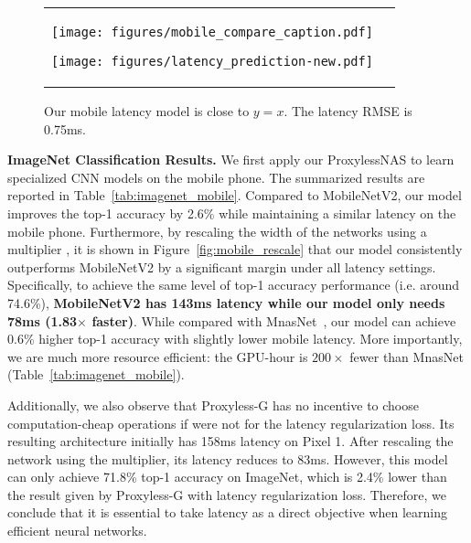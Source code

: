 \documentclass{article} \usepackage{iclr2019_conference,times}
\newcommand{\minisection}[1]{\vspace{5pt}\noindent\textbf{#1.}}
\begin{document}
\begin{figure}[t]
    \centering
    \begin{tabular}{l  r}
    \begin{minipage}{0.40\linewidth}
        \texttt{[image: figures/mobile\_compare\_caption.pdf]}
        \caption{ProxylessNAS consistently outperforms MobileNetV2 under various latency settings.}
        \label{fig:mobile_rescale}
    \end{minipage}
    \qquad
    \begin{minipage}{0.42\linewidth}
        \texttt{[image: figures/latency\_prediction-new.pdf]}
        \caption{Our mobile latency model is close to $y=x$. The latency RMSE is 0.75ms.}
        \label{fig:latency_prediction}
    \end{minipage}
    \end{tabular}
\end{figure}

\minisection{ImageNet Classification Results} We first apply our ProxylessNAS to learn specialized CNN models on the mobile phone. The summarized results are reported in Table~\ref{tab:imagenet_mobile}. Compared to MobileNetV2, our model improves the top-1 accuracy by 2.6\% while maintaining a similar latency on the mobile phone. Furthermore, by rescaling the width of the networks using a multiplier \citep{sandler2018mobilenetv2,tan2018mnasnet}, it is shown in Figure~\ref{fig:mobile_rescale} that our model consistently outperforms MobileNetV2 by a significant margin under all latency settings. Specifically, to achieve the same level of top-1 accuracy performance (i.e. around 74.6\%), \textbf{MobileNetV2 has 143ms latency while our model only needs 78ms (1.83$\times$ faster)}. While compared with MnasNet~\citep{tan2018mnasnet}, our model can achieve 0.6\% higher top-1 accuracy with slightly lower mobile latency. More importantly, we are much more resource efficient: the GPU-hour is $200\times$ fewer than MnasNet (Table~\ref{tab:imagenet_mobile}). 

Additionally, we also observe that Proxyless-G has no incentive to choose computation-cheap operations if were not for the latency regularization loss. Its resulting architecture initially has 158ms latency on Pixel 1. After rescaling the network using the multiplier, its latency reduces to 83ms. However, this model can only achieve 71.8\% top-1 accuracy on ImageNet, which is 2.4\% lower than the result given by Proxyless-G with latency regularization loss. Therefore, we conclude that it is essential to take latency as a direct objective when learning efficient neural networks.
\end{document}
